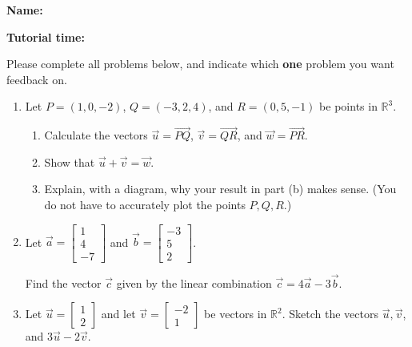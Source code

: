 \documentclass[12pt]{article}
\newcommand{\R}{\mathbb{R}}
\newcommand{\bbm}{\begin{bmatrix}}
\newcommand{\ebm}{\end{bmatrix}}
\begin{document}
{\bf \Large Name:}

\bigskip

{\bf \large Tutorial time:}

\bigskip

\thispagestyle{fancy}
Please complete all problems below, and indicate which {\bf one} problem you want feedback on.
 \begin{enumerate}
 \item  Let $P=(1,0,-2)$, $Q=(-3,2,4)$, and $R=(0,5,-1)$ be points in $\R^3$.
\begin{enumerate}
 \item Calculate the vectors $\vec{u}=\overrightarrow{PQ}$, $\vec{v}=\overrightarrow{QR}$, and $\vec{w}=\overrightarrow{PR}$.

\vspace{2in}

 \item Show that $\vec{u}+\vec{v} = \vec{w}$.

\vspace{2in}

 \item Explain, with a diagram, why your result in part (b) makes sense. (You do not have to accurately plot the points $P,Q,R$.)


\end{enumerate}
\newpage

\item Let $\vec{a} = \begin{bmatrix}1\\4\\-7\end{bmatrix}$ and $\vec{b} = \begin{bmatrix}-3\\5\\2\end{bmatrix}$.

\medskip

Find the vector $\vec{c}$ given by the linear combination $\vec{c} = 4\vec{a}-3\vec{b}$.

\vspace{3.5in}

\item Let $\vec{u} = \bbm 1\\2\ebm$ and let $\vec{v} = \bbm -2\\1\ebm$ be vectors in $\R^2$. Sketch the vectors $\vec{u}, \vec{v}$, and $3\vec{u}-2\vec{v}$.



\end{enumerate}
\end{document}
